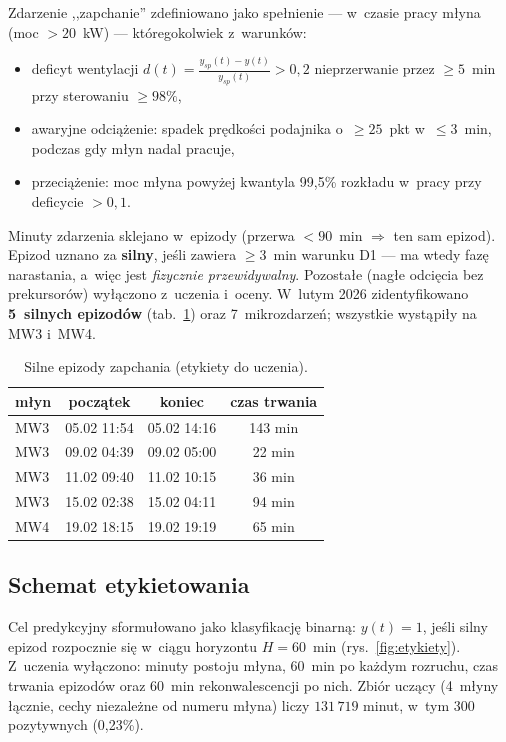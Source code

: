 \documentclass[11pt,a4paper]{article}
\begin{document}
Zdarzenie ,,zapchanie'' zdefiniowano jako spełnienie --- w~czasie pracy młyna
(moc $>20$~kW) --- któregokolwiek z~warunków:
\begin{itemize}
  \item[\textbf{D1}] deficyt wentylacji
        $d(t) = \tfrac{y_{sp}(t)-y(t)}{y_{sp}(t)} > 0{,}2$
        nieprzerwanie przez $\ge 5$~min przy sterowaniu $\ge 98\%$,
  \item[\textbf{D2}] awaryjne odciążenie: spadek prędkości podajnika
        o~$\ge 25$~pkt w~$\le 3$~min, podczas gdy młyn nadal pracuje,
  \item[\textbf{D3}] przeciążenie: moc młyna powyżej kwantyla 99{,}5\%
        rozkładu w~pracy przy deficycie $>0{,}1$.
\end{itemize}
Minuty zdarzenia sklejano w~epizody (przerwa $<90$~min $\Rightarrow$ ten sam
epizod). Epizod uznano za \textbf{silny}, jeśli zawiera $\ge 3$~min warunku D1
--- ma wtedy fazę narastania, a~więc jest \emph{fizycznie przewidywalny}.
Pozostałe (nagłe odcięcia bez prekursorów) wyłączono z~uczenia i~oceny.
W~lutym 2026 zidentyfikowano \textbf{5~silnych epizodów} (tab.~\ref{tab:epizody})
oraz 7~mikrozdarzeń; wszystkie wystąpiły na MW3 i~MW4.

\begin{table}[H]
\centering\small
\caption{Silne epizody zapchania (etykiety do uczenia).}
\label{tab:epizody}
\begin{tabular}{lccc}
\toprule
młyn & początek & koniec & czas trwania \\
\midrule
MW3 & 05.02 11:54 & 05.02 14:16 & 143 min \\
MW3 & 09.02 04:39 & 09.02 05:00 & 22 min \\
MW3 & 11.02 09:40 & 11.02 10:15 & 36 min \\
MW3 & 15.02 02:38 & 15.02 04:11 & 94 min \\
MW4 & 19.02 18:15 & 19.02 19:19 & 65 min \\
\bottomrule
\end{tabular}
\end{table}

\subsection{Schemat etykietowania}

Cel predykcyjny sformułowano jako klasyfikację binarną: $y(t)=1$, jeśli silny
epizod rozpocznie się w~ciągu horyzontu $H=60$~min
(rys.~\ref{fig:etykiety}). Z~uczenia wyłączono: minuty postoju młyna, 60~min
po każdym rozruchu, czas trwania epizodów oraz 60~min rekonwalescencji po
nich. Zbiór uczący (4~młyny łącznie, cechy niezależne od numeru młyna)
liczy $131\,719$ minut, w~tym 300 pozytywnych (0{,}23\%).
\end{document}
